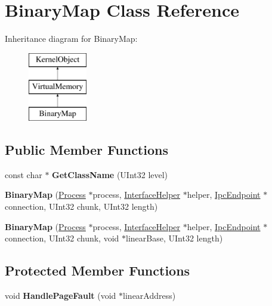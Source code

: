 \hypertarget{class_binary_map}{}\section{Binary\+Map Class Reference}
\label{class_binary_map}
Inheritance diagram for Binary\+Map\+:\begin{figure}[H]
\begin{center}
\leavevmode
\includegraphics[height=3.000000cm]{class_binary_map}
\end{center}
\end{figure}
\subsection*{Public Member Functions}
\begin{DoxyCompactItemize}
\item 
\mbox{\label{class_binary_map_af1dd6999b9654702d7a12310f0854d15}} 
const char $\ast$ {\bfseries Get\+Class\+Name} (U\+Int32 level)
\item 
\mbox{\label{class_binary_map_a712e67a9b086c0978216c6dadd1ba013}} 
{\bfseries Binary\+Map} (\hyperlink{class_process}{Process} $\ast$process, \hyperlink{class_interface_helper}{Interface\+Helper} $\ast$helper, \hyperlink{class_ipc_endpoint}{Ipc\+Endpoint} $\ast$connection, U\+Int32 chunk, U\+Int32 length)
\item 
\mbox{\label{class_binary_map_ac1d23ebb9816d0e5b38f45d96df950ee}} 
{\bfseries Binary\+Map} (\hyperlink{class_process}{Process} $\ast$process, \hyperlink{class_interface_helper}{Interface\+Helper} $\ast$helper, \hyperlink{class_ipc_endpoint}{Ipc\+Endpoint} $\ast$connection, U\+Int32 chunk, void $\ast$linear\+Base, U\+Int32 length)
\end{DoxyCompactItemize}
\subsection*{Protected Member Functions}
\begin{DoxyCompactItemize}
\item 
\mbox{\label{class_binary_map_a2c58d83d15b26cb74bda9ac5b2e88e83}} 
void {\bfseries Handle\+Page\+Fault} (void $\ast$linear\+Address)
\end{DoxyCompactItemize}
